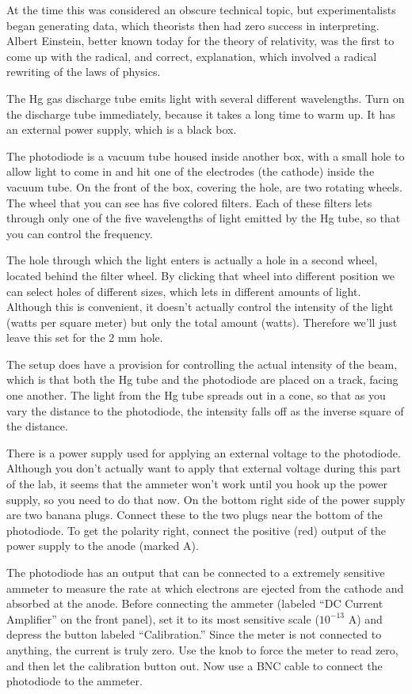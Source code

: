 At the time this was considered an obscure technical topic, but experimentalists
began generating data, which theorists then had zero success in interpreting.
Albert Einstein,
better known today for the theory of relativity, was the
first to come up with the radical, and correct, explanation,
which involved a radical rewriting of the laws of physics.

\setup

The Hg gas discharge tube emits
light with several different wavelengths.
Turn on the discharge tube immediately, because it takes a long time to warm up.
It has an external power supply, which is a black box.

The photodiode is a vacuum tube housed inside another box, with a small hole
to allow light to come in and hit one of the electrodes (the cathode) inside the vacuum tube.
On the front of the box, covering the hole, are two rotating wheels.  The wheel
that you can see has five colored filters. Each of these filters lets through only
one of the five wavelengths of light emitted by the Hg tube, so that you can control
the frequency.

The hole through which the light enters is actually
a hole in a second wheel, located behind the filter wheel. By clicking that wheel into different position we can
select holes of different sizes, which lets in different amounts of light.
Although this is convenient, it doesn't actually control the intensity of the light (watts per square meter)
but only the total amount (watts). Therefore we'll just leave this set for the 2 mm hole.

The setup does have a provision for controlling the actual intensity of the beam, which is that both
the Hg tube and the photodiode are placed on a track, facing one another.  The light from the Hg tube
spreads out in a cone, so that as you vary the distance to the photodiode, the intensity falls off as
the inverse square of the distance.

There is a power supply used for applying an external voltage to the photodiode. Although you don't
actually want to apply that external voltage during this part of the lab, it seems that the ammeter
won't work until you hook up the power supply, so you need to do that now.
On the bottom right side of the power supply are two banana plugs. Connect these to the
two plugs near the bottom of the photodiode. To get the polarity right, connect the 
positive (red) output of the power supply to the anode (marked A).

The photodiode has an output that can be connected to a extremely sensitive ammeter to measure the
rate at which electrons are ejected from the cathode and absorbed at the anode. Before connecting the
ammeter (labeled ``DC Current Amplifier'' on the front panel), set it to its most sensitive scale
($10^{-13}$ A) and depress the button labeled ``Calibration.'' Since the meter is not connected to anything,
the current is truly zero. Use the knob to force the meter to read zero, and then let the calibration button out.
Now use a BNC cable to connect the photodiode to the ammeter.

